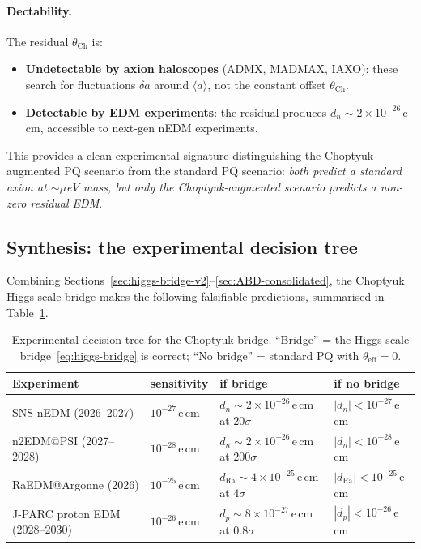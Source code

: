\paragraph{Dectability.}
The residual $\theta_{\mathrm{Ch}}$ is:
\begin{itemize}[leftmargin=2em,itemsep=0.1em]
  \item \textbf{Undetectable by axion haloscopes} (ADMX, MADMAX,
        IAXO): these search for fluctuations $\delta a$ around
        $\langle a\rangle$, not the constant offset $\theta_{\mathrm{Ch}}$.
  \item \textbf{Detectable by EDM experiments}: the residual produces
        $d_n\sim 2\times 10^{-26}\,$e\,cm, accessible to next-gen
        nEDM experiments.
\end{itemize}
This provides a clean experimental signature distinguishing the
Choptyuk-augmented PQ scenario from the standard PQ scenario:
\emph{both predict a standard axion at $\sim\mu$eV mass, but only the
Choptyuk-augmented scenario predicts a non-zero residual EDM}.

\subsection{Synthesis: the experimental decision tree}
\label{ssec:decision-tree}

Combining Sections~\ref{sec:higgs-bridge-v2}--\ref{sec:ABD-consolidated},
the Choptyuk Higgs-scale bridge makes the following falsifiable
predictions, summarised in Table~\ref{tab:decision-tree}.

\begin{table}[htbp]
\centering
\small
\caption{Experimental decision tree for the Choptyuk bridge.
``Bridge'' = the Higgs-scale bridge~\eqref{eq:higgs-bridge} is correct;
``No bridge'' = standard PQ with $\theta_{\mathrm{eff}}=0$.}
\label{tab:decision-tree}
\begin{tabularx}{\textwidth}{@{}lXXX@{}}
\toprule
Experiment & sensitivity & if bridge & if no bridge \\
\midrule
SNS nEDM (2026--2027) & $10^{-27}\,$e\,cm
  & $d_n\sim 2\times 10^{-26}\,$e\,cm at $20\sigma$
  & $|d_n|<10^{-27}\,$e\,cm \\
n2EDM@PSI (2027--2028) & $10^{-28}\,$e\,cm
  & $d_n\sim 2\times 10^{-26}\,$e\,cm at $200\sigma$
  & $|d_n|<10^{-28}\,$e\,cm \\
RaEDM@Argonne (2026) & $10^{-25}\,$e\,cm
  & $d_{\mathrm{Ra}}\sim 4\times 10^{-25}\,$e\,cm at $4\sigma$
  & $|d_{\mathrm{Ra}}|<10^{-25}\,$e\,cm \\
J-PARC proton EDM (2028--2030) & $10^{-26}\,$e\,cm
  & $d_p\sim 8\times 10^{-27}\,$e\,cm at $0.8\sigma$
  & $|d_p|<10^{-26}\,$e\,cm \\
\bottomrule
\end{tabularx}
\end{table}

